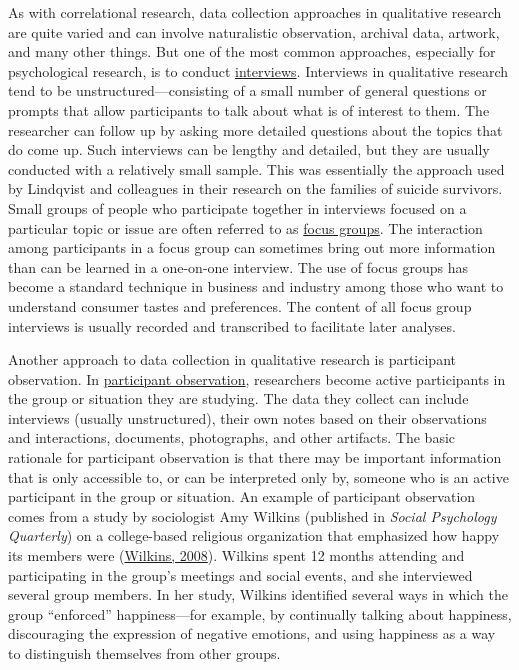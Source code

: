 \documentclass[
]{krantz}
\begin{document}
As with correlational research, data collection approaches in qualitative research are quite varied and can involve naturalistic observation, archival data, artwork, and many other things. But one of the most common approaches, especially for psychological research, is to conduct \protect\hyperlink{interviews}{interviews}. Interviews in qualitative research tend to be unstructured---consisting of a small number of general questions or prompts that allow participants to talk about what is of interest to them. The researcher can follow up by asking more detailed questions about the topics that do come up. Such interviews can be lengthy and detailed, but they are usually conducted with a relatively small sample. This was essentially the approach used by Lindqvist and colleagues in their research on the families of suicide survivors. Small groups of people who participate together in interviews focused on a particular topic or issue are often referred to as \protect\hyperlink{focus-groups}{focus groups}. The interaction among participants in a focus group can sometimes bring out more information than can be learned in a one-on-one interview. The use of focus groups has become a standard technique in business and industry among those who want to understand consumer tastes and preferences. The content of all focus group interviews is usually recorded and transcribed to facilitate later analyses.

Another approach to data collection in qualitative research is participant observation. In \protect\hyperlink{participant-observation}{participant observation}, researchers become active participants in the group or situation they are studying. The data they collect can include interviews (usually unstructured), their own notes based on their observations and interactions, documents, photographs, and other artifacts. The basic rationale for participant observation is that there may be important information that is only accessible to, or can be interpreted only by, someone who is an active participant in the group or situation. An example of participant observation comes from a study by sociologist Amy Wilkins (published in \emph{Social Psychology Quarterly}) on a college-based religious organization that emphasized how happy its members were (\protect\hyperlink{ref-wilkins2008happier}{Wilkins, 2008}). Wilkins spent 12 months attending and participating in the group's meetings and social events, and she interviewed several group members. In her study, Wilkins identified several ways in which the group ``enforced'' happiness---for example, by continually talking about happiness, discouraging the expression of negative emotions, and using happiness as a way to distinguish themselves from other groups.
\end{document}
